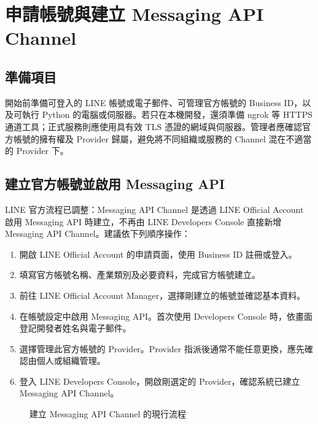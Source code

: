 \documentclass[12pt,a4paper]{report}
\begin{document}
\chapter{申請帳號與建立 Messaging API Channel}
\section{準備項目}
開始前準備可登入的 LINE 帳號或電子郵件、可管理官方帳號的 Business ID，以及可執行 Python 的電腦或伺服器。若只在本機開發，還須準備 ngrok 等 HTTPS 通道工具；正式服務則應使用具有效 TLS 憑證的網域與伺服器。管理者應確認官方帳號的擁有權及 Provider 歸屬，避免將不同組織或服務的 Channel 混在不適當的 Provider 下。

\section{建立官方帳號並啟用 Messaging API}
LINE 官方流程已調整：Messaging API Channel 是透過 LINE Official Account 啟用 Messaging API 時建立，不再由 LINE Developers Console 直接新增 Messaging API Channel。建議依下列順序操作：
\begin{enumerate}
  \item 開啟 LINE Official Account 的申請頁面，使用 Business ID 註冊或登入。
  \item 填寫官方帳號名稱、產業類別及必要資料，完成官方帳號建立。
  \item 前往 LINE Official Account Manager，選擇剛建立的帳號並確認基本資料。
  \item 在帳號設定中啟用 Messaging API。首次使用 Developers Console 時，依畫面登記開發者姓名與電子郵件。
  \item 選擇管理此官方帳號的 Provider。Provider 指派後通常不能任意更換，應先確認由個人或組織管理。
  \item 登入 LINE Developers Console，開啟剛選定的 Provider，確認系統已建立 Messaging API Channel。
\end{enumerate}

\begin{figure}[htbp]
\centering
{}
\caption{建立 Messaging API Channel 的現行流程}
\label{fig:registration}
\end{figure}
\end{document}
